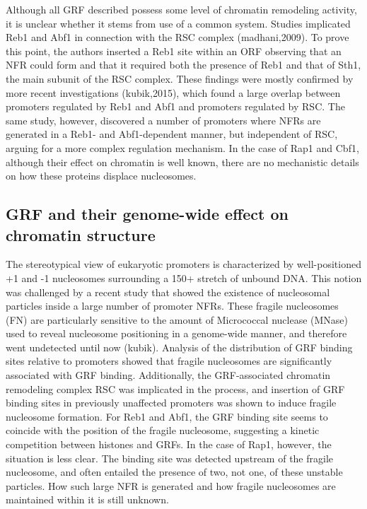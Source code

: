 Although all GRF described possess some level of chromatin remodeling activity, it is unclear whether it stems from use of a common system. Studies implicated Reb1 and Abf1 in connection with the RSC complex (madhani,2009). To prove this point, the authors inserted a Reb1 site within an ORF observing that an NFR could form and that it required both the presence of Reb1 and that of Sth1, the main subunit of the RSC complex. These findings were mostly confirmed by more recent investigations (kubik,2015), which found a large overlap between promoters regulated by Reb1 and Abf1 and promoters regulated by RSC. The same study, however, discovered a number of promoters where NFRs are generated in a Reb1- and Abf1-dependent manner, but independent of RSC, arguing for a more complex regulation mechanism. In the case of Rap1 and Cbf1, although their effect on chromatin is well known, there are no mechanistic details on how these proteins displace nucleosomes. 

\subsection{GRF and their genome-wide effect on chromatin structure}

The stereotypical view of eukaryotic promoters is characterized by well-positioned +1 and -1 nucleosomes surrounding a 150+ stretch of unbound DNA. This notion was challenged by a recent study that showed the existence of nucleosomal particles inside a large number of promoter NFRs. These fragile nucleosomes (FN) are particularly sensitive to the amount of Micrococcal nuclease (MNase) used to reveal nucleosome positioning in a genome-wide manner, and therefore went undetected until now (kubik). Analysis of the distribution of GRF binding sites relative to promoters showed that fragile nucleosomes are significantly associated with GRF binding. Additionally, the GRF-associated chromatin remodeling complex RSC was implicated in the process, and insertion of GRF binding sites in previously unaffected promoters was shown to induce fragile nucleosome formation. For Reb1 and Abf1, the GRF binding site seems to coincide with the position of the fragile nucleosome, suggesting a kinetic competition between histones and GRFs. In the case of Rap1, however, the situation is less clear. The binding site was detected upstream of the fragile nucleosome, and often entailed the presence of two, not one, of these unstable particles. How such large NFR is generated and how fragile nucleosomes are maintained within it is still unknown. 

